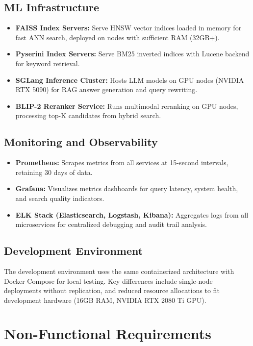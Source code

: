 \subsection{ML Infrastructure}
\begin{itemize}
    \item \textbf{FAISS Index Servers:} Serve HNSW vector indices loaded in memory for fast ANN search, deployed on nodes with sufficient RAM (32GB+).
    \item \textbf{Pyserini Index Servers:} Serve BM25 inverted indices with Lucene backend for keyword retrieval.
    \item \textbf{SGLang Inference Cluster:} Hosts LLM models on GPU nodes (NVIDIA RTX 5090) for RAG answer generation and query rewriting.
    \item \textbf{BLIP-2 Reranker Service:} Runs multimodal reranking on GPU nodes, processing top-K candidates from hybrid search.
\end{itemize}

\subsection{Monitoring and Observability}
\begin{itemize}
    \item \textbf{Prometheus:} Scrapes metrics from all services at 15-second intervals, retaining 30 days of data.
    \item \textbf{Grafana:} Visualizes metrics dashboards for query latency, system health, and search quality indicators.
    \item \textbf{ELK Stack (Elasticsearch, Logstash, Kibana):} Aggregates logs from all microservices for centralized debugging and audit trail analysis.
\end{itemize}

\subsection{Development Environment}
The development environment uses the same containerized architecture with Docker Compose for local testing. Key differences include single-node deployments without replication, and reduced resource allocations to fit development hardware (16GB RAM, NVIDIA RTX 2080 Ti GPU).

\clearpage

\section{Non-Functional Requirements}

